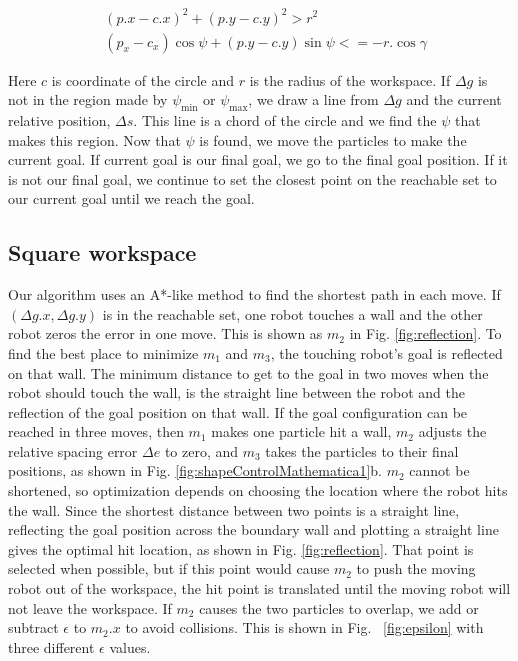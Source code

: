 \begin{align}\label{eq:ifinchord}
&(p.x - c.x)^2 + (p.y - c.y)^2  > r^2\\ \nonumber
 &(p_x - c_x) \cos\psi + (p.y- c.y) \sin\psi <= -r. \cos\gamma
\end{align}

Here $c$ is coordinate of the circle and $r$ is the radius of the workspace.
 If $\Delta g$ is not in the region made by $\psi_{\min}$ or $\psi_{\max}$, we draw a line from $\Delta g$ and the current relative position, $\Delta s$. This line is a chord of the circle and we find the $\psi$ that makes this region. Now that $\psi$ is found, we move the particles to make the current goal. If current goal is our final goal, we go to the final goal position. If it is not our final goal, we continue to set the closest point on the reachable set to our current goal until we reach the goal. 
   

 \subsection{Square workspace}
Our algorithm uses an A*-like method to find the shortest path in each move. 
If $(\Delta g.x, \Delta g.y)$ is in the reachable set, one robot touches a wall and the other robot zeros the error in one move. This is shown as $m_2$ in Fig. \ref{fig:reflection}. To find the best place to minimize $m_1$ and $m_3$, the touching robot's goal is reflected on that wall. 
The minimum distance to get to the goal in two moves when the robot should touch the wall, is the straight line between the robot and the reflection of the goal position on that wall. 
If the goal configuration can be reached in three moves, then $m_1$  makes one particle hit a wall, $m_2$ adjusts the relative spacing error $\Delta e$ to zero, and  $m_3$ takes the particles to their final positions, as shown in Fig. \ref{fig:shapeControlMathematica1}b. 
$m_2$ cannot be shortened, so optimization depends on choosing the location where the robot hits the wall. 
 Since the shortest distance between two points is a straight line, reflecting the goal position across the boundary wall and plotting a straight line gives the optimal hit location, as shown in Fig. \ref{fig:reflection}.
That point is selected when possible, but if this point would cause $m_2$ to push the moving robot out of the workspace, the hit point is translated until the moving robot will not leave the workspace. If $m_2$ causes the two particles to overlap, we add or subtract $\epsilon$ to $m_2.x$ to avoid collisions. This is shown in Fig. ~\ref{fig:epsilon} with three different $\epsilon$ values.


